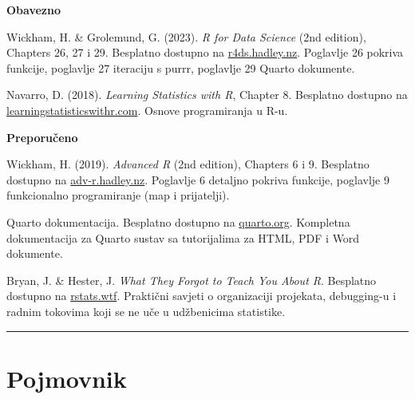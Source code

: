 \documentclass[
  croatian,
  letterpaper,
  DIV=11,
  numbers=noendperiod]{scrartcl}
\begin{document}
\textbf{Obavezno}

Wickham, H. \& Grolemund, G. (2023). \emph{R for Data Science} (2nd
edition), Chapters 26, 27 i 29. Besplatno dostupno na
\href{https://r4ds.hadley.nz}{r4ds.hadley.nz}. Poglavlje 26 pokriva
funkcije, poglavlje 27 iteraciju s purrr, poglavlje 29 Quarto dokumente.

Navarro, D. (2018). \emph{Learning Statistics with R}, Chapter 8.
Besplatno dostupno na
\href{https://learningstatisticswithr.com/lsr-0.6.pdf}{learningstatisticswithr.com}.
Osnove programiranja u R-u.

\textbf{Preporučeno}

Wickham, H. (2019). \emph{Advanced R} (2nd edition), Chapters 6 i 9.
Besplatno dostupno na \href{https://adv-r.hadley.nz}{adv-r.hadley.nz}.
Poglavlje 6 detaljno pokriva funkcije, poglavlje 9 funkcionalno
programiranje (map i prijatelji).

Quarto dokumentacija. Besplatno dostupno na
\href{https://quarto.org}{quarto.org}. Kompletna dokumentacija za Quarto
sustav sa tutorijalima za HTML, PDF i Word dokumente.

Bryan, J. \& Hester, J. \emph{What They Forgot to Teach You About R}.
Besplatno dostupno na \href{https://rstats.wtf}{rstats.wtf}. Praktični
savjeti o organizaciji projekata, debugging-u i radnim tokovima koji se
ne uče u udžbenicima statistike.

\begin{center}\rule{0.5\linewidth}{0.5pt}\end{center}

\section{Pojmovnik}\label{pojmovnik}
\end{document}
